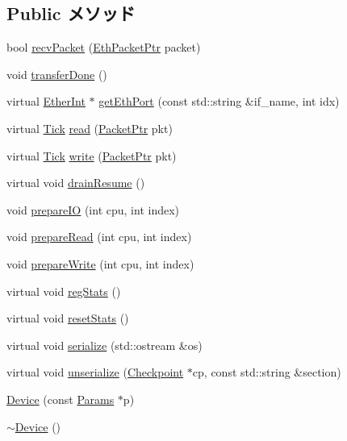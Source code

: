 \subsection*{Public メソッド}
\begin{DoxyCompactItemize}
\item 
bool \hyperlink{classSinic_1_1Device_ad54e71348f53dfb5444979e9bfaf3164}{recvPacket} (\hyperlink{classRefCountingPtr}{EthPacketPtr} packet)
\item 
void \hyperlink{classSinic_1_1Device_ac47b2c25cccfafe7e2c12673a1b3e793}{transferDone} ()
\item 
virtual \hyperlink{classEtherInt}{EtherInt} $\ast$ \hyperlink{classSinic_1_1Device_a10260c5a583c0894dcdcd1ced50a53ae}{getEthPort} (const std::string \&if\_\-name, int idx)
\item 
virtual \hyperlink{base_2types_8hh_a5c8ed81b7d238c9083e1037ba6d61643}{Tick} \hyperlink{classSinic_1_1Device_a613ec7d5e1ec64f8d21fec78ae8e568e}{read} (\hyperlink{classPacket}{PacketPtr} pkt)
\item 
virtual \hyperlink{base_2types_8hh_a5c8ed81b7d238c9083e1037ba6d61643}{Tick} \hyperlink{classSinic_1_1Device_a4cefab464e72b5dd42c003a0a4341802}{write} (\hyperlink{classPacket}{PacketPtr} pkt)
\item 
virtual void \hyperlink{classSinic_1_1Device_a8f020d3237536fe007fc488c4125c5d8}{drainResume} ()
\item 
void \hyperlink{classSinic_1_1Device_a65d0ce31d782d0d1233ce4a464e21fe3}{prepareIO} (int cpu, int index)
\item 
void \hyperlink{classSinic_1_1Device_a90e004f9ca30532075cace46234c6ad5}{prepareRead} (int cpu, int index)
\item 
void \hyperlink{classSinic_1_1Device_a8527de0a20c247f91f96abe895bf4448}{prepareWrite} (int cpu, int index)
\item 
virtual void \hyperlink{classSinic_1_1Device_a4dc637449366fcdfc4e764cdf12d9b11}{regStats} ()
\item 
virtual void \hyperlink{classSinic_1_1Device_a65880e61108132689a1bd769b9187fb7}{resetStats} ()
\item 
virtual void \hyperlink{classSinic_1_1Device_a53e036786d17361be4c7320d39c99b84}{serialize} (std::ostream \&os)
\item 
virtual void \hyperlink{classSinic_1_1Device_af22e5d6d660b97db37003ac61ac4ee49}{unserialize} (\hyperlink{classCheckpoint}{Checkpoint} $\ast$cp, const std::string \&section)
\item 
\hyperlink{classSinic_1_1Device_a3e931e68104ea04933647b3c2e08097b}{Device} (const \hyperlink{classSinic_1_1Base_ae32fbee6dea75ffbb01b7d869c7bedad}{Params} $\ast$p)
\item 
\hyperlink{classSinic_1_1Device_a3b1601f6f775f47420713f755d1ef320}{$\sim$Device} ()
\end{DoxyCompactItemize}

